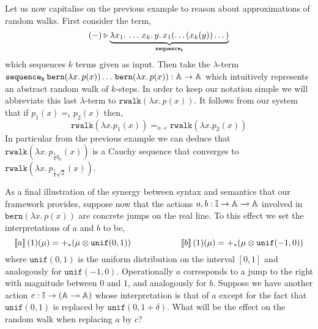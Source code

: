 \documentclass[a4paper,UKenglish,cleveref, autoref, thm-restate]{lipics-v2021}
\begin{document}
\begin{example} 
        Let us now capitalise on the previous example to reason about
        approximations of random walks. First consider the term,
        \[
                (-) \triangleright \underbrace{\lambda x_1. \, \dots \, x_k. \, y. \,
                x_1 (\dots (x_k(y)) \dots)}_{\mathtt{sequence_k}}
        \]
        which sequences $k$ terms given as input. Then take the $\lambda$-term
        $\mathtt{sequence_k} \> \mathtt{bern}(\lambda x. \, p(x)) \dots \,
        \mathtt{bern}(\lambda x. \, p(x)) : \mathbb{A} \to \mathbb{A}$ which
        intuitively represents an abstract random walk of $k$-steps. In order
        to keep our notation simple we will abbreviate this last $\lambda$-term to
        $\mathtt{rwalk}(\lambda x. \, p(x))$.  It follows from our system that
        if $p_1(x) =_\epsilon p_2(x)$ then,
        \[
                \mathtt{rwalk}(\lambda x. p_1(x)) =_{n \cdot \epsilon}
                \mathtt{rwalk}(\lambda x. p_2(x)) 
        \]
        In particular from the previous example we can deduce that
        $\mathtt{rwalk}\left (\lambda x. \, p_{\frac{1}{2} q_n} (x) \right )$
        is a Cauchy sequence that converges to $\mathtt{rwalk}\left (\lambda x.
        \, p_{\frac{1}{2} \sqrt{2}} (x) \right )$.

        As a final illustration of the synergy between syntax and semantics
        that our framework provides, suppose now that the actions $a,b : \mathbb{I}
        \to \mathbb{A} \multimap \mathbb{A}$ involved in $\mathtt{bern}(\lambda x. \,
        p(x))$ are concrete jumps on the real line. To this effect we set the
        interpretations of $a$ and $b$ to be,
        \[
                        \left \llbracket a \right \rrbracket(1)(\mu) = +_\ast(\mu \otimes \mathtt{unif}(0,1))
                        \hspace{2cm}
                        \left \llbracket b \right \rrbracket(1)(\mu) = +_\ast(\mu \otimes \mathtt{unif}(-1,0))
        \]
        where $\mathtt{unif}(0,1)$ is the uniform distribution on the interval
        $[0,1]$ and analogously for $\mathtt{unif}(-1,0)$.  Operationally $a$
        corresponds to a jump to the right with magnitude between $0$ and $1$,
        and analogously for $b$. Suppose we have another action $c : \mathbb{I} \to
        (\mathbb{A} \multimap \mathbb{A})$ whose interpretation is that of $a$ except
        for the fact that $\mathtt{unif}(0,1)$ is replaced by
        $\mathtt{unif}(0,1+\delta)$. What will be the effect on the random walk
        when replacing $a$ by $c$? 


\end{example}
\end{document}
